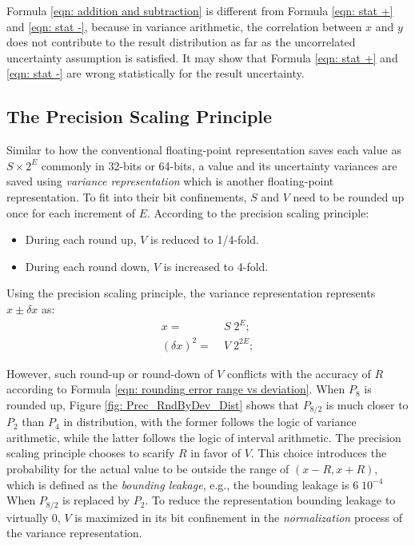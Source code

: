 \documentclass[twoside]{article}
\numberwithin{equation}{section}
\begin{document}
Formula \eqref{eqn: addition and subtraction} is different from Formula \eqref{eqn: stat +} and \eqref{eqn: stat -}, because in variance arithmetic, the correlation between $x$ and $y$ does not contribute to the result distribution as far as the uncorrelated uncertainty assumption is satisfied.
It may show that Formula \eqref{eqn: stat +} and \eqref{eqn: stat -} are wrong statistically for the result uncertainty.


\subsection{The Precision Scaling Principle  \cite{Prev_Precision_Arithmetic}}

Similar to how the conventional floating-point representation \cite{Floating_Point_Standard} saves each value as $S\times 2^E$ commonly in 32-bits or 64-bits, a value and its uncertainty variances are saved using \emph{variance representation} which is another floating-point representation.
To fit into their bit confinements, $S$ and $V$ need to be rounded up once for each increment of $E$.
According to the precision scaling principle:
\begin{itemize}
\item During each round up, $V$ is reduced to 1/4-fold. 

\item During each round down, $V$ is increased to 4-fold.
\end{itemize}
Using the precision scaling principle, the variance representation represents $x \pm \delta x$ as:
\begin{align}
\label{eqn: accurate value}
x =&\; S \; 2^{E};\\
\label{eqn: uncertainty variance}
(\delta x)^2 =&\; V \; 2^{2E};
\end{align}

However, such round-up or round-down of $V$ conflicts with the accuracy of $R$ according to Formula \eqref{eqn: rounding error range vs deviation}.
When $P_8$ is rounded up, Figure \ref{fig: Prec_RndByDev_Dist} shows that $P_{8/2}$ is much closer to $P_2$ than $P_4$ in distribution, with the former follows the logic of variance arithmetic, while the latter follows the logic of interval arithmetic. 
The precision scaling principle chooses to scarify $R$ in favor of $V$.
This choice introduces the probability for the actual value to be outside the range of $(x - R, x + R)$, which is defined as the \emph{bounding leakage}, e.g., the bounding leakage is $6\;10^{-4}$ When $P_{8/2}$ is replaced by $P_2$.
To reduce the representation bounding leakage to virtually 0, $V$ is maximized in its bit confinement in the \emph{normalization} process of the variance representation.
\end{document}
